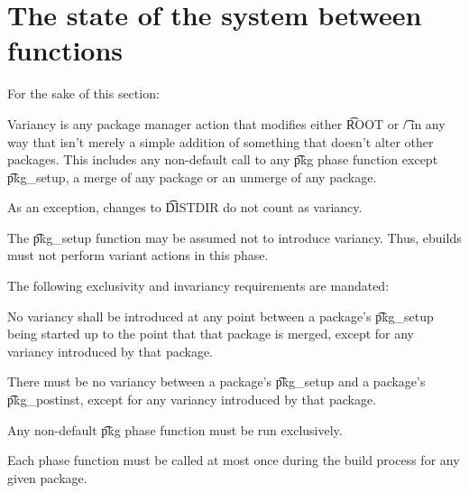 \section{The state of the system between functions}

For the sake of this section:
\nobreakpar
\begin{compactitem}
\item Variancy is any package manager action that modifies either \t{ROOT} or \t{/} in any way that
    isn't merely a simple addition of something that doesn't alter other packages. This includes
    any non-default call to any \t{pkg} phase function except \t{pkg_setup}, a merge of any package
    or an unmerge of any package.
\item As an exception, changes to \t{DISTDIR} do not count as variancy.
\item The \t{pkg_setup} function may be assumed not to introduce variancy. Thus, ebuilds must not
    perform variant actions in this phase.
\end{compactitem}

The following exclusivity and invariancy requirements are mandated:
\nobreakpar
\begin{compactitem}
\item No variancy shall be introduced at any point between a package's \t{pkg_setup} being started
    up to the point that that package is merged, except for any variancy introduced by that package.
\item There must be no variancy between a package's \t{pkg_setup} and a package's \t{pkg_postinst},
    except for any variancy introduced by that package.
\item Any non-default \t{pkg} phase function must be run exclusively.
\item Each phase function must be called at most once during the build process for any given
    package.
\end{compactitem}


